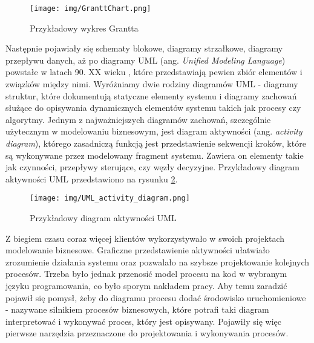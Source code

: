 \documentclass[declaration,shortabstract,mgr]{iithesis}
\begin{document}
\begin{figure}[H]
    \texttt{[image: img/GranttChart.png]}
    \caption{Przykładowy wykres Grantta}
    \label{fig:grantt-chart}
\end{figure}

Następnie pojawiały się schematy blokowe, diagramy strzałkowe, diagramy przepływu danych, aż po diagramy UML (ang. \textit{Unified Modeling Language}) powstałe w latach 90. XX wieku \cite{uml-wiki}, które przedstawiają pewien zbiór elementów i związków między nimi. Wyróżniamy dwie rodziny diagramów UML - diagramy struktur, które dokumentują statyczne elementy systemu i diagramy zachowań służące do opisywania dynamicznych elementów systemu takich jak procesy czy algorytmy. Jednym z najważniejszych diagramów zachowań, szczególnie użytecznym w modelowaniu biznesowym, jest diagram aktywności (ang. \textit{activity diagram}), którego zasadniczą funkcją jest przedstawienie sekwencji kroków, które są wykonywane przez modelowany fragment systemu. Zawiera on elementy takie jak czynności, przepływy sterujące, czy węzły decyzyjne. Przykładowy diagram aktywności UML przedstawiono na rysunku \ref{fig:uml-activity-diagram}.

\begin{figure}[H]
    \texttt{[image: img/UML\_activity\_diagram.png]}
    \caption{Przykładowy diagram aktywności UML}
    \label{fig:uml-activity-diagram}
\end{figure}

Z biegiem czasu coraz więcej klientów wykorzystywało w swoich projektach modelowanie biznesowe. Graficzne przedstawienie aktywności ułatwiało zrozumienie działania systemu oraz pozwalało na szybsze projektowanie kolejnych procesów. Trzeba było jednak przenosić model procesu na kod w wybranym języku programowania, co było sporym nakładem pracy. Aby temu zaradzić pojawił się pomysł, żeby do diagramu procesu dodać środowisko uruchomieniowe - nazywane silnikiem procesów biznesowych, które potrafi taki diagram interpretować i wykonywać proces, który jest opisywany. Pojawiły się więc pierwsze narzędzia przeznaczone do projektowania i wykonywania procesów.
\end{document}
